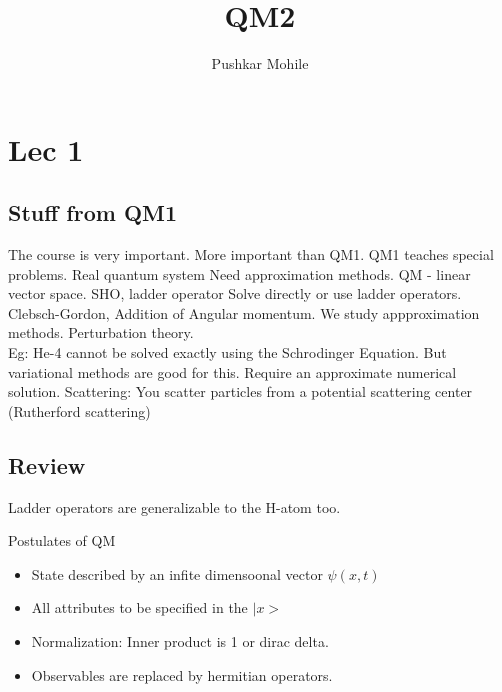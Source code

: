 \documentclass{article}
\title{QM2 }
\author{Pushkar Mohile}
\begin{document}
 \maketitle 
 \section{Lec 1}
 \subsection{Stuff from QM1}
 The course is very important. More important than QM1. QM1 teaches special problems. Real quantum system 
 Need approximation methods. 
 QM - linear vector space. 
 SHO, ladder operator Solve directly or use ladder operators. Clebsch-Gordon, Addition of Angular momentum. 
We study appproximation methods. Perturbation theory. \\
Eg: He-4 cannot be solved exactly using the Schrodinger Equation. But variational methods are good for this. 
 Require an approximate numerical solution.
 Scattering: You scatter particles from a potential scattering center (Rutherford scattering)
 \subsection{Review}
 Ladder operators are generalizable to the H-atom too. 

 Postulates of QM
 \begin{itemize}
     \item State described by an infite dimensoonal vector \( \psi(x,t) \) 
     \item All attributes to be specified in the \(|x> \)
     \item Normalization: Inner product is 1 or dirac delta. 
     \item Observables are replaced by hermitian operators. 
    
    \end{itemize}
\end{document}
